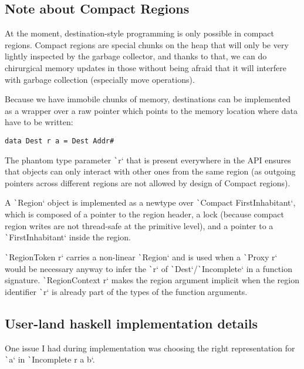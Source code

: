 \documentclass[english]{jflart}
\begin{document}
\subsection{Note about Compact Regions}

At the moment, destination-style programming is only possible in compact regions. Compact regions are special chunks on the heap that will only be very lightly inspected by the garbage collector, and thanks to that, we can do chirurgical memory updates in those without being afraid that it will interfere with garbage collection (especially move operations).

Because we have immobile chunks of memory, destinations can be implemented as a wrapper over a raw pointer which points to the memory location where data have to be written:

\begin{verbatim}
data Dest r a = Dest Addr#
\end{verbatim}

The phantom type parameter \texttt`r` that is present everywhere in the API ensures that objects can only interact with other ones from the same region (as outgoing pointers across different regions are not allowed by design of Compact regions).

A \texttt`Region` object is implemented as a newtype over \texttt`Compact FirstInhabitant`, which is composed of a pointer to the region header, a lock (because compact region writes are not thread-safe at the primitive level), and a pointer to a \texttt`FirstInhabitant` inside the region.

\texttt`RegionToken r` carries a non-linear \texttt`Region` and is used when a \texttt`Proxy r` would be necessary anyway to infer the \texttt`r` of \texttt`Dest`/\texttt`Incomplete` in a function signature. \texttt`RegionContext r` makes the region argument implicit when the region identifier \texttt`r` is already part of the types of the function arguments.

\subsection{User-land haskell implementation details}
 
One issue I had during implementation was choosing the right representation for \texttt`a` in \texttt`Incomplete r a b`.
\end{document}
